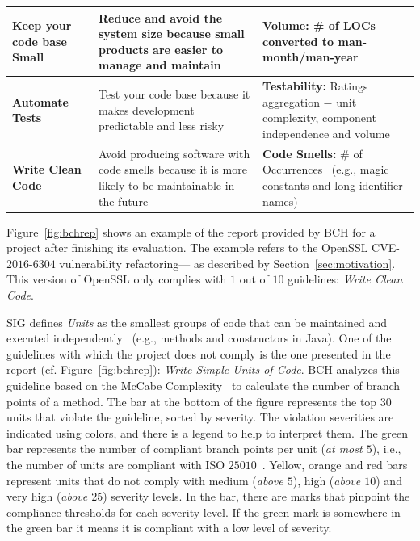 \documentclass[10pt,conference]{IEEEtran}
\begin{document}
\begin{table}[h]
\begin{tabular}{L{1.66cm}L{3.3cm}L{2.7cm}}
\textbf{Keep your code base Small} & Reduce and avoid the system size because
small products are easier to manage and maintain & \textbf{Volume:} \# of LOCs converted 
to man-month/man-year~\cite{criteria:2017} \\\midrule

\textbf{Automate Tests} & Test your code base because it makes development
predictable and less risky & \textbf{Testability:} Ratings aggregation $-$ unit 
complexity, component independence and volume~\cite{Visser:2016:OREILLY}
 \\\midrule

\textbf{Write Clean Code} & Avoid producing software with code smells because
it is more likely to be maintainable in the future & \textbf{Code Smells:} 
\# of Occurrences~\cite{Visser:2016:OREILLY} (e.g., magic constants and long 
identifier names) \\
\bottomrule
\end{tabular}
\label{tab:guidelines}
\vspace{-0.5cm}
\end{table}


Figure~\ref{fig:bchrep} shows an example of the report
provided by BCH for a project after finishing its evaluation. The example
refers to the OpenSSL CVE-$2016$-$6304$ vulnerability refactoring---
as described by Section~\ref{sec:motivation}. This
version of OpenSSL only complies with $1$ out of $10$ guidelines: \emph{Write
Clean Code}.

SIG defines \emph{Units} as the smallest groups of code that can be maintained
and executed independently~\cite{Visser:2016:OREILLY} (e.g., methods and
constructors in Java). One of the guidelines with which the project does not
comply is the one presented in the report (cf. Figure~\ref{fig:bchrep}):
\emph{Write Simple Units of Code}. BCH analyzes this guideline based on the
McCabe Complexity~\cite{1702388} to calculate the number of branch points of a
method. The bar at the bottom of the figure represents the top $30$ units that
violate the guideline, sorted by severity. The violation severities are
indicated using colors, and there is a legend to help to interpret them. The
green bar represents the number of compliant branch points per unit (\emph{at
most $5$}), i.e., the number of units are compliant with ISO
$25010$~\cite{iso:2011}. Yellow, orange and red bars represent units that do not
comply with medium (\emph{above $5$}), high (\emph{above $10$}) and very high
(\emph{above $25$}) severity levels. In the bar, there are marks that pinpoint
the compliance thresholds for each severity level. If the green mark is
somewhere in the green bar it means it is compliant with a low level of
severity.
\end{document}
